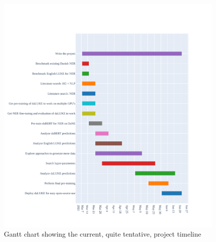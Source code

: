 \documentclass[12pt,fleqn]{article}
\begin{document}
\begin{figure}[H]
    \centering
        \includegraphics[width=\linewidth]{gantt}
        \caption{Gantt chart showing the current, quite tentative, project timeline}
    \label{fig:gantt}
\end{figure}\noindent
\end{document}
